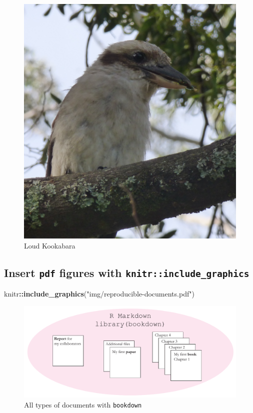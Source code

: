 \documentclass[12pt,]{article}
\newenvironment{Shaded}{\begin{snugshade}}{\end{snugshade}}
\newcommand{\KeywordTok}[1]{\textcolor[rgb]{0.13,0.29,0.53}{\textbf{#1}}}
\newcommand{\StringTok}[1]{\textcolor[rgb]{0.31,0.60,0.02}{#1}}
\newcommand{\OperatorTok}[1]{\textcolor[rgb]{0.81,0.36,0.00}{\textbf{#1}}}
\newcommand{\NormalTok}[1]{#1}
\begin{document}
\begin{figure}
\centering
\includegraphics{img/loud-kooka-1.pdf}
\caption{\label{fig:loud-kooka}Loud Kookabara}
\end{figure}

\subsection{\texorpdfstring{Insert \texttt{pdf} figures with
\texttt{knitr::include\_graphics}}{Insert pdf figures with knitr::include\_graphics}}\label{insert-pdf-figures-with-knitrinclude_graphics}

\begin{Shaded}
\begin{Highlighting}[]
\NormalTok{knitr}\OperatorTok{::}\KeywordTok{include_graphics}\NormalTok{(}\StringTok{"img/reproducible-documents.pdf"}\NormalTok{)}
\end{Highlighting}
\end{Shaded}

\begin{figure}
\centering
\includegraphics{img/reproducible-documents.pdf}
\caption{\label{fig:bookdown-docs}All types of documents with
\texttt{bookdown}}
\end{figure}
\end{document}
